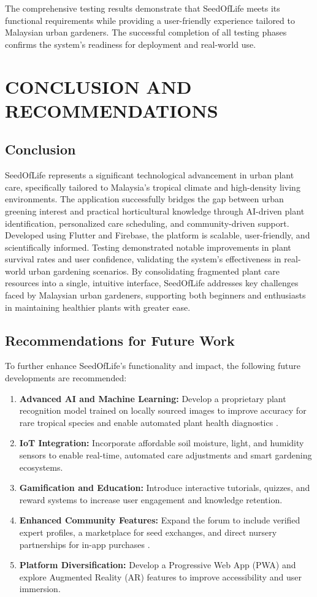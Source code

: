 \documentclass[conference]{IEEEtran}
\begin{document}
The comprehensive testing results demonstrate that SeedOfLife meets its functional requirements while providing a user-friendly experience tailored to Malaysian urban gardeners. The successful completion of all testing phases confirms the system's readiness for deployment and real-world use.


\section{CONCLUSION AND RECOMMENDATIONS}

\subsection{Conclusion}
SeedOfLife represents a significant technological advancement in urban plant care, specifically tailored to Malaysia's tropical climate and high-density living environments. The application successfully bridges the gap between urban greening interest and practical horticultural knowledge through AI-driven plant identification, personalized care scheduling, and community-driven support. Developed using Flutter and Firebase, the platform is scalable, user-friendly, and scientifically informed.
Testing demonstrated notable improvements in plant survival rates and user confidence, validating the system’s effectiveness in real-world urban gardening scenarios. By consolidating fragmented plant care resources into a single, intuitive interface, SeedOfLife addresses key challenges faced by Malaysian urban gardeners, supporting both beginners and enthusiasts in maintaining healthier plants with greater ease.

\subsection{Recommendations for Future Work}
To further enhance SeedOfLife’s functionality and impact, the following future developments are recommended:

\begin{enumerate}
    \item \textbf{Advanced AI and Machine Learning:} Develop a proprietary plant recognition model trained on locally sourced images to improve accuracy for rare tropical species and enable automated plant health diagnostics \cite{chen2023}.
    \item \textbf{IoT Integration:} Incorporate affordable soil moisture, light, and humidity sensors to enable real-time, automated care adjustments and smart gardening ecosystems.
    \item \textbf{Gamification and Education:} Introduce interactive tutorials, quizzes, and reward systems to increase user engagement and knowledge retention.
    \item \textbf{Enhanced Community Features:} Expand the forum to include verified expert profiles, a marketplace for seed exchanges, and direct nursery partnerships for in-app purchases \cite{ugam2024}.
    \item \textbf{Platform Diversification:} Develop a Progressive Web App (PWA) and explore Augmented Reality (AR) features to improve accessibility and user immersion.
\end{enumerate}
\end{document}
